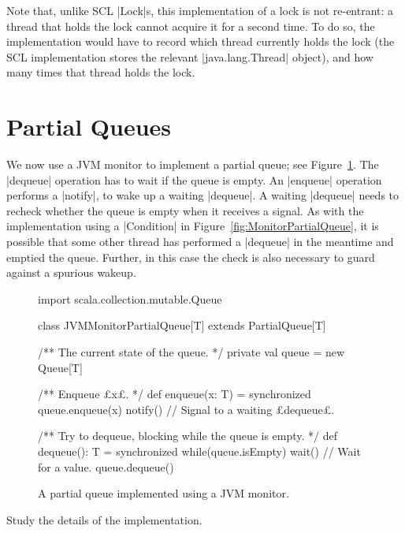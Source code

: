 Note that, unlike SCL |Lock|s, this implementation of a lock is not
re-entrant: a thread that holds the lock cannot acquire it for a second time.
To do so, the implementation would have to record which thread currently holds
the lock (the SCL implementation stores the relevant |java.lang.Thread|
object), and how many times that thread holds the lock.  



\section{Partial Queues}

We now use a JVM monitor to implement a partial queue; see
Figure~\ref{fig:partial-queue-JVM-monitor}.  The |dequeue| operation has to
wait if the queue is empty.  An |enqueue| operation performs a |notify|, to
wake up a waiting |dequeue|.
%
A waiting |dequeue| needs to recheck whether the queue is empty when it
receives a signal.  As with the implementation using a |Condition| in
Figure~\ref{fig:MonitorPartialQueue}, it is possible that some other thread
has performed a |dequeue| in the meantime and emptied the queue.  Further, in
this case the check is also necessary to guard against a spurious wakeup.


\begin{figure}
\begin{scala}
import scala.collection.mutable.Queue

class JVMMonitorPartialQueue[T] extends PartialQueue[T]{
  /** The current state of the queue. */
  private val queue = new Queue[T]

  /** Enqueue £x£. */
  def enqueue(x: T) = synchronized{ 
    queue.enqueue(x) 
    notify() // Signal to a waiting £dequeue£.
  }

  /** Try to dequeue, blocking while the queue is empty.  */
  def dequeue(): T = synchronized{ 
    while(queue.isEmpty) wait() // Wait for a value.
    queue.dequeue() 
  }
}
\end{scala}
\caption{A partial queue implemented using a JVM monitor.}
\label{fig:partial-queue-JVM-monitor}
\end{figure}



\begin{instruction}
Study the details of the implementation.
\end{instruction}

